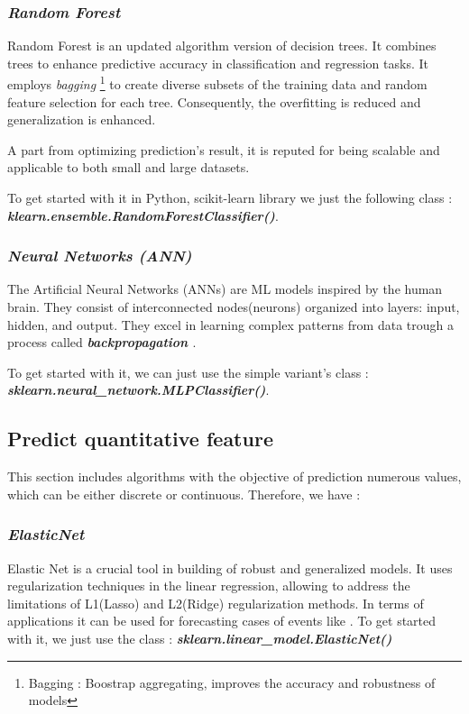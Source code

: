 \documentclass[12pt,a4paper]{report}
\begin{document}
\subsubsection{\textit{Random Forest}}
Random Forest is an updated algorithm version of  decision trees. It combines trees to enhance predictive accuracy in classification and regression tasks. It employs \textit{bagging} \footnote{Bagging : Boostrap aggregating, improves the accuracy and robustness of models}  to create diverse subsets of the training data and random feature selection for each tree\cite{lin2017ensemble}. Consequently, the overfitting is reduced and generalization is enhanced. 

A part from optimizing prediction's result, it is reputed for being scalable and applicable to both small and large datasets. 

To get started with it in Python, scikit-learn library we just the following class : \textbf{\textit{klearn.ensemble.RandomForestClassifier()}}. 
\subsubsection{\textit{Neural Networks (ANN)}}
The Artificial Neural Networks (ANNs) are ML models inspired by the human brain. They consist of interconnected nodes(neurons) \cite{boateng2020basic} organized into layers: input, hidden, and output. They excel in learning complex patterns from data trough a process called \textbf{\textit{backpropagation} \cite{lillicrap2020backpropagation}}. 

To get started with it, we can just use the simple variant's class : \newline \textit{\textbf{sklearn.neural\_network.MLPClassifier()}}.

\subsection{Predict quantitative feature} 
This section includes algorithms with the objective of prediction numerous values, which can be either discrete or continuous. Therefore, we have :
\subsubsection{\textit{ElasticNet}}
Elastic Net is a crucial tool in building of robust and generalized models. It uses regularization techniques in the linear regression, allowing to address the limitations of L1(Lasso) and L2(Ridge) regularization methods. In terms of applications it can be used for forecasting cases of events like \cite{johnsen2020elastic}.
To get started with it, we just use the class : \textit{\textbf{sklearn.linear\_model.ElasticNet()}}
\end{document}
